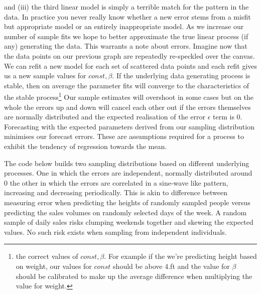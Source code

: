 \documentclass[10pt,a4paper,notitlepage, twocolumn]{article}
\begin{document}
and (iii) the third linear model is simply a terrible match for the pattern in the data. In practice you never really know whether a new error stems from a misfit but appropriate model or an entirely inappropriate model. As we increase our number of sample fits we hope to better approximate the true linear process (if any) generating the data. This warrants a note about errors. Imagine now that the data points on our previous graph are repeatedly re-speckled over the canvas. We can refit a new model for each set of scattered data points and each refit gives us a new sample values for $ const, \beta$. If the underlying data generating process is stable, then on average the parameter fits will converge to the characteristics of the stable process\footnote{the correct values of $const, \beta$. For example if the we're predicting height based on weight, our values for $const$ should be above 4.ft and the value for $\beta$ should be calibrated to make up the average difference when multiplying the value for weight.} Our sample estimates will overshoot in some cases but on the whole the errors up and down will cancel each other out if the errors themselves are normally distributed and the expected realisation of the error $\epsilon$ term is 0. Forecasting with the expected parameters derived from our sampling distribution minimises our forecast errors. These are assumptions required for a process to exhibit the tendency of regression towards the mean. 

The code below builds two sampling distributions based on different underlying processes.  One in which the errors are independent, normally distributed around 0 the other in which the errors are correlated in a sine-wave like pattern, increasing and decreasing periodically. This is akin to difference between measuring error when predicting the heights of randomly sampled people versus predicting the sales volumes on randomly selected days of the week. A random sample of daily sales  risks clumping weekends together and skewing the expected values. No such risk exists when sampling from independent individuals. 
\end{document}
